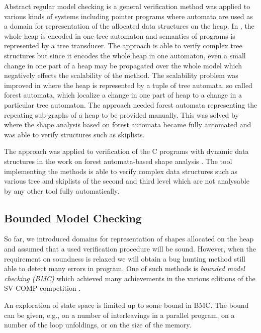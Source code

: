 	  Abstract regular model checking is a general verification method was applied to various kinds of systems
	  including pointer programs \cite{bhrv06b, forester11, boxes13} where automata are used as a domain
	  for representation of the allocated data structures on the heap.
	  In \cite{bhrv06b}, the whole heap is encoded in one tree automaton and semantics of
	  programs is represented by a tree transducer.
	  The approach is able to verify complex tree structures but since it encodes the whole
	  heap in one automaton, even a small change in one part of a heap may
	  be propagated over the whole model which negatively effects the scalability of the method.
	  The scalability problem was improved in \cite{forester11} where the heap is represented by a tuple of 
	  tree automata, so called forest automata, which localize a change in one part of heap
	  to a change in a particular tree automaton.
	  The approach needed forest automata representing the repeating sub-graphs of a heap
	  to be provided manually.
	  This was solved by \cite{boxes13} where the shape analysis based on forest automata became
	  fully automated and was able to verify structures such as skiplists.

	  The approach was applied to verification of the C programs with dynamic data structures in
	  the work on forest automata-based shape analysis \cite{forester12}.
	  The \forester{} tool implementing the methods is able to verify complex data structures
	  such as various tree and skiplists of the second and third level \cite{boxes13, vmcai17} which
	  are not analysable by any other tool fully automatically.

	  \subsection{Bounded Model Checking}

	  So far, we introduced domains for representation of shapes allocated on the heap and
	  assumed that a used verification procedure will be sound.
	  However, when the requirement on soundness is relaxed we will obtain a bug hunting method
	  still able to detect many errors in program.
	  One of such methods is \emph{bounded model checking (BMC)} which achieved many achievements
	  in the various editions of the SV-COMP competition \cite{svcompweb}.

	  An exploration of state space is limited up to some bound in BMC.
	  The bound can be given, e.g., on a number of interleavings in a parallel program,
	  on a number of the loop unfoldings, or on the size of the memory.
	  
